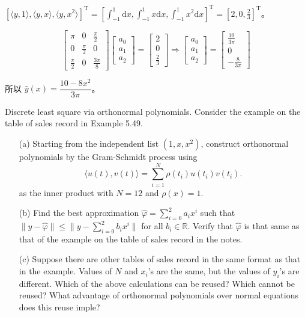 \documentclass[lang=cn,a4paper,newtx,bibend=bibtex]{elegantpaper}
\newcommand{\dd}{\mathrm{d}}
\newcommand{\Int}[4]{\int_{#1}^{#2}{#3}{\dd {#4}}}
\newcommand{\indot}[2]{\langle {#1}, {#2} \rangle}
\begin{document}
\begin{solution}
\begin{enumerate}
$\left[\indot{y}{1}, \indot{y}{x}, \indot{y}{x^2} \right]^{\mathrm{T}} = \left[\Int{-1}{1}{}{x}, \Int{-1}{1}{x}{x}, \Int{-1}{1}{x^2}{x}\right]^{\mathrm{T}} = \left[2, 0, \frac{2}{3}\right]^{\mathrm{T}}$。

\[
  \begin{bmatrix}
    \pi & 0 & \frac{\pi}2 \\
    0 & \frac{\pi}2 & 0  \\
    \frac{\pi}2 & 0 & \frac{3\pi}8
  \end{bmatrix}
  \begin{bmatrix}
    a_0 \\ a_1 \\ a_2
  \end{bmatrix}
  = \begin{bmatrix}
    2 \\ 0 \\ \frac23
  \end{bmatrix}
  \Rightarrow
  \begin{bmatrix}
    a_0 \\ a_1 \\ a_2
  \end{bmatrix}
  = \begin{bmatrix}
    \frac{10}{3\pi} \\ 0 \\ -\frac{8}{3\pi}
  \end{bmatrix}
\]

所以 $\hat{y}(x) = \dfrac{10 - 8x^2}{3\pi}$。

\end{enumerate}
\end{solution}

\begin{prob}
  Discrete least square via orthonormal polynomials.
  Consider the example on the table of sales record in Example 5.49.
\begin{enumerate}
  \item[(a)] Starting from the independent list $(1, x, x^2)$, construct orthonormal
  polynomials by the Gram-Schmidt process using
  \[\langle u(t), v(t) \rangle = \sum_{i = 1}^{N} \rho(t_i)u(t_i)v(t_i).\]
  as the inner product with $N = 12$ and $\rho(x) = 1$.
  \item[(b)] Find the best approximation $\hat{\varphi} = \sum_{i = 0}^2 a_i x^i$ such that
  $\| y - \hat{\varphi}\| \le \| y - \sum_{i = 0}^2 b_i x^i\|$ for all $b_i \in \mathbb{R}$.
  Verify that $\hat{\varphi}$ is that same as that of the example on the table of sales record
  in the notes.
  \item[(c)] Suppose there are other tables of sales record in
  the same format as that in the example. Values
  of $N$ and $x_i$’s are the same, but the values of $y_i$’s
  are different. Which of the above calculations can
  be reused? Which cannot be reused? What advantage of orthonormal polynomials
  over normal equations does this reuse imple?
\end{enumerate}
\end{prob}
\end{document}
